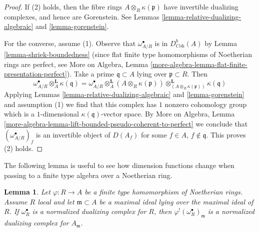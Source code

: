 \documentclass{stacks-project}
\theoremstyle{plain}
\newtheorem{lemma}[subsection]{Lemma}
\theoremstyle{definition}
\theoremstyle{remark}
\numberwithin{equation}{subsection}
\begin{document}
\begin{proof}
If (2) holds, then the fibre rings $A \otimes_R \kappa(\mathfrak p)$
have invertible dualizing complexes, and hence are Gorenstein.
See Lemmas \ref{lemma-relative-dualizing-algebraic} and \ref{lemma-gorenstein}.

\medskip\noindent
For the converse, assume (1).
Observe that $\omega_{A/R}^\bullet$ is in $D^b_{\textit{Coh}}(A)$
by Lemma \ref{lemma-shriek-boundedness} (since flat finite type homomorphisms
of Noetherian rings are perfect, see 
More on Algebra, Lemma
\ref{more-algebra-lemma-flat-finite-presentation-perfect}).
Take a prime $\mathfrak q \subset A$ lying over $\mathfrak p \subset R$.
Then
$$
\omega_{A/R}^\bullet \otimes_A^\mathbf{L} \kappa(\mathfrak q) =
\omega_{A/R}^\bullet \otimes_A^\mathbf{L}
(A \otimes_R \kappa(\mathfrak p))
\otimes_{(A \otimes_R \kappa(\mathfrak p))}^\mathbf{L}
\kappa(\mathfrak q)
$$
Applying Lemmas \ref{lemma-relative-dualizing-algebraic} and
\ref{lemma-gorenstein} and assumption (1) we find that this complex has $1$
nonzero cohomology group which is a $1$-dimensional
$\kappa(\mathfrak q)$-vector space. By
More on Algebra, Lemma
\ref{more-algebra-lemma-lift-bounded-pseudo-coherent-to-perfect}
we conclude that $(\omega_{A/R}^\bullet)_f$ is an invertible
object of $D(A_f)$ for some $f \in A$, $f \not \in \mathfrak q$.
This proves (2) holds.
\end{proof}

\noindent
The following lemma is useful to see how dimension functions change
when passing to a finite type algebra over a Noetherian ring.

\begin{lemma}
\label{lemma-shriek-normalized}
Let $\varphi : R \to A$ be a finite type homomorphism of Noetherian rings.
Assume $R$ local and let $\mathfrak m \subset A$ be a maximal
ideal lying over the maximal ideal of $R$. If $\omega_R^\bullet$
is a normalized dualizing complex for $R$, then
$\varphi^!(\omega_R^\bullet)_\mathfrak m$ is a normalized
dualizing complex for $A_\mathfrak m$.
\end{lemma}
\end{document}
